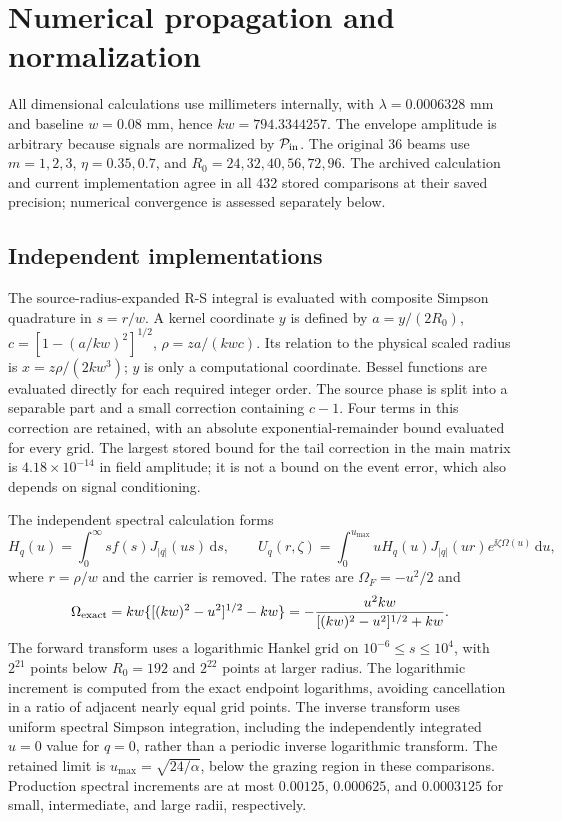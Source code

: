 \section{Numerical propagation and normalization}
\label{sec:si-numerics}
All dimensional calculations use millimeters internally, with
$\lambda=0.0006328$ mm and baseline $w=0.08$ mm, hence $kw=794.3344257$.
The envelope amplitude is arbitrary because signals are normalized by
$\mathcal P_{\rm in}$. The original 36 beams use
$m=1,2,3$, $\eta=0.35,0.7$, and
$R_0=24,32,40,56,72,96$. The archived calculation and current implementation
agree in all 432 stored comparisons at their saved precision; numerical
convergence is assessed separately below.

\subsection{Independent implementations}
The source-radius-expanded R-S integral is evaluated with composite Simpson
quadrature in $s=r/w$. A kernel coordinate $y$ is defined by
$a=y/(2R_0)$, $c=[1-(a/kw)^2]^{1/2}$,
$\rho=z a/(kw c)$. Its relation to the physical scaled radius is
$x=z\rho/(2kw^3)$; $y$ is only a computational coordinate.
Bessel functions are evaluated directly for each required integer order.
The source phase is split into a separable part and a small correction
containing $c-1$. Four terms in this correction are retained, with an
absolute exponential-remainder bound evaluated for every grid.
The largest stored bound for the tail correction in the main matrix is
$4.18\times10^{-14}$ in field amplitude; it is not a bound on the
event error, which also depends on signal conditioning.

The independent spectral calculation forms
\begin{equation}
H_q(u)=\int_0^\infty s f(s)J_{|q|}(us)\,\mathrm{d}s,\qquad
U_q(r,\zeta)=\int_0^{u_{\max}}u H_q(u)J_{|q|}(ur)
e^{\ii\zeta\Omega(u)}\,\mathrm{d}u,
\end{equation}
where $r=\rho/w$ and the carrier is removed. The rates are
$\Omega_F=-u^2/2$ and
\begin{equation}
\Omega_{\rm exact}=kw\{[(kw)^2-u^2]^{1/2}-kw\}
=-\frac{u^2kw}{[(kw)^2-u^2]^{1/2}+kw}.
\end{equation}
The forward transform uses a logarithmic Hankel grid on
$10^{-6}\leq s\leq10^4$, with $2^{21}$ points below $R_0=192$ and
$2^{22}$ points at larger radius. The logarithmic increment is computed
from the exact endpoint logarithms, avoiding cancellation in a ratio of
adjacent nearly equal grid points. The inverse transform uses uniform
spectral Simpson integration, including the independently integrated
$u=0$ value for $q=0$, rather than a periodic inverse logarithmic transform.
The retained limit is $u_{\max}=\sqrt{24/\alpha}$, below the grazing
region in these comparisons. Production spectral increments are at most
$0.00125$, $0.000625$, and $0.0003125$ for small, intermediate, and
large radii, respectively.

